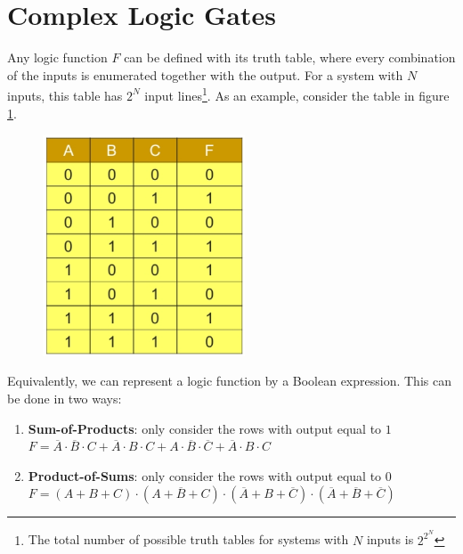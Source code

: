 \section{Complex Logic Gates}
Any logic function $F$ can be defined with its truth table, where every combination of the inputs is enumerated together with the output. For a system with $N$ inputs, this table has $2^N$ input lines\footnote{The total number of possible truth tables for systems with $N$ inputs is $2^{2^N}$}. As an example, consider the table in figure \ref{fig:truth_table}.
\begin{figure}[h!]
	\centering
	\includegraphics[width=6cm]{figures/ch13/truth_table.jpg}
	\caption{}
	\label{fig:truth_table}
\end{figure}
Equivalently, we can represent a logic function by a Boolean expression. This can be done in two ways:
\begin{enumerate}
	\item \textbf{Sum-of-Products}: only consider the rows with output equal to $1$\\
	$F = \overline{A} \cdot \overline{B}  \cdot  C + \overline{A} \cdot  B  \cdot  C + A  \cdot \overline{B}  \cdot \overline{C} + \overline{A}  \cdot B  \cdot C $
	\item \textbf{Product-of-Sums}: only consider the rows with output equal to $0$\\
	$F = (A + B + C) \cdot (A + \overline{B} + C) \cdot (\overline{A} + B + \overline{C}) \cdot (\overline{A} + \overline{B} + \overline{C}) $
\end{enumerate} 

